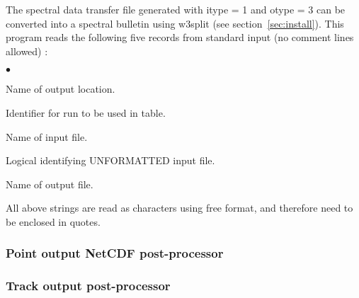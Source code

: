 
\vspace{\baselineskip} 
\noindent 
The spectral data transfer file generated with {\F itype = 1} and {\F otype =
3} can be converted into a spectral bulletin using {\file w3split} (see
section~\ref{sec:install}). This program reads the following five records from
standard input (no comment lines allowed) :

\begin{list}{$\bullet$}{\itemsep 0mm \parsep 0mm}
\item Name of output location.
\item Identifier for run to be used in table.
\item Name of input file.
\item Logical identifying UNFORMATTED input file.
\item Name of output file.
\end{list}

\noindent
All above strings are read as characters using free format, and therefore need
to be enclosed in quotes.


\pb
\vsssub
\subsubsection{Point output NetCDF post-processor} \label{sec:post_ncp}
\vsssub



\vspace{\baselineskip} 
\noindent 


\pb
\vsssub
\subsubsection{Track output post-processor} \label{sec:post_t}
\vsssub


